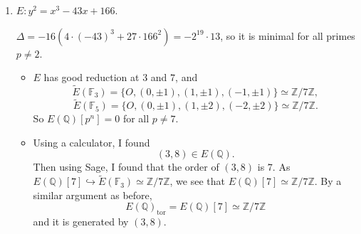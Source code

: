 \documentclass{article}
\theoremstyle{definition}
\theoremstyle{remark}
\newcommand{\Q}{\mathbb{Q}}
\newcommand{\Z}{\mathbb{Z}}
\newcommand{\F}{\mathbb{F}}
\newcommand{\tor}{\mathrm{tor}}
\begin{document}
\begin{enumerate}
    \item $E : y^2 = x^3 - 43x + 166$.

    $\Delta = -16(4\cdot (-43)^3 + 27\cdot 166^2) = -2^{19}\cdot 13$, so it is minimal for all primes $p\ne 2$.
    \begin{itemize}
        \item $E$ has good reduction at $3$ and $7$,
        and \[\tilde{E}(\F_3) = \{O, (0, \pm 1), (1, \pm 1), (-1, \pm 1)\}\simeq\Z/7\Z,\]
        \[\tilde{E}(\F_5) = \{O, (0, \pm 1), (1, \pm 2), (-2, \pm 2)\}\simeq\Z/7\Z.\]
        So $E(\Q)[p^n] = 0$ for all $p\ne 7$.
        \item Using a calculator, I found \[(3, 8)\in E(\Q).\]
        Then using Sage, I found that the order of $(3, 8)$ is $7$. As $E(\Q)[7]\hookrightarrow \tilde{E}(\F_3)\simeq\Z/7\Z$, we see that $E(\Q)[7]\simeq\Z/7\Z$.
        By a similar argument as before,
        \[E(\Q)_\tor = E(\Q)[7] \simeq\Z/7\Z\] and it is generated by $(3, 8)$.
    \end{itemize}
\end{enumerate}
\end{document}
